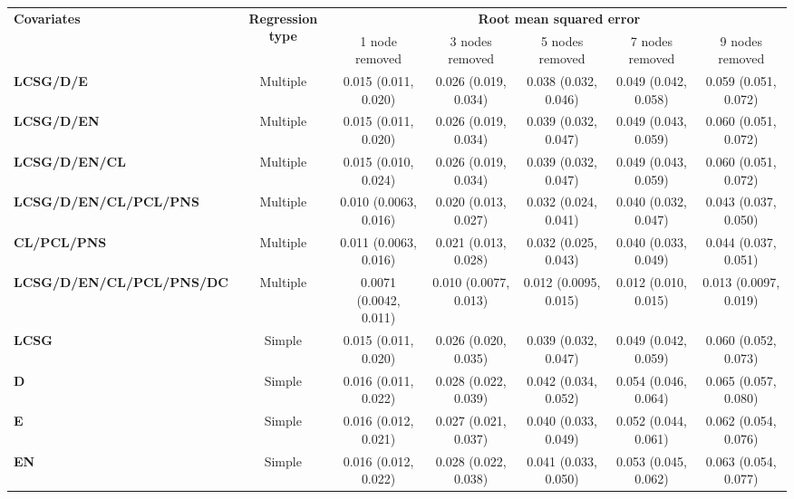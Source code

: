 \begin{landscape}

\vspace*{\fill}
\begin{table}[!hp]
\centering
\tiny
\renewcommand\tabcolsep{3pt}

\begin{tabular}{lcccccc}
\toprule

\multirow{2}{*}{\textbf{Covariates}} & \multirow{2}{*}{\textbf{Regression type}} & \multicolumn{5}{c}{\textbf{Root mean squared error}} \\
 & & 1 node removed & 3 nodes removed & 5 nodes removed & 7 nodes removed & 9 nodes removed \\
\midrule

\textbf{LCSG/D/E} & Multiple & 0.015 (0.011, 0.020) & 0.026 (0.019, 0.034) & 0.038 (0.032, 0.046) & 0.049 (0.042, 0.058) & 0.059 (0.051, 0.072) \\ 
\textbf{LCSG/D/EN} & Multiple & 0.015 (0.011, 0.020) & 0.026 (0.019, 0.034) & 0.039 (0.032, 0.047) & 0.049 (0.043, 0.059) & 0.060 (0.051, 0.072) \\ 
\textbf{LCSG/D/EN/CL} & Multiple & 0.015 (0.010, 0.024) & 0.026 (0.019, 0.034) & 0.039 (0.032, 0.047) & 0.049 (0.043, 0.059) & 0.060 (0.051, 0.072) \\ 
\textbf{LCSG/D/EN/CL/PCL/PNS} & Multiple & 0.010 (0.0063, 0.016) & 0.020 (0.013, 0.027) & 0.032 (0.024, 0.041) & 0.040 (0.032, 0.047) & 0.043 (0.037, 0.050) \\ 
\textbf{CL/PCL/PNS} & Multiple & 0.011 (0.0063, 0.016) & 0.021 (0.013, 0.028) & 0.032 (0.025, 0.043) & 0.040 (0.033, 0.049) & 0.044 (0.037, 0.051) \\ 
\textbf{LCSG/D/EN/CL/PCL/PNS/DC} & Multiple & 0.0071 (0.0042, 0.011) & 0.010 (0.0077, 0.013) & 0.012 (0.0095, 0.015) & 0.012 (0.010, 0.015) & 0.013 (0.0097, 0.019) \\ 
\textbf{LCSG} & Simple & 0.015 (0.011, 0.020) & 0.026 (0.020, 0.035) & 0.039 (0.032, 0.047) & 0.049 (0.042, 0.059) & 0.060 (0.052, 0.073) \\ 
\textbf{D} & Simple & 0.016 (0.011, 0.022) & 0.028 (0.022, 0.039) & 0.042 (0.034, 0.052) & 0.054 (0.046, 0.064) & 0.065 (0.057, 0.080) \\ 
\textbf{E} & Simple & 0.016 (0.012, 0.021) & 0.027 (0.021, 0.037) & 0.040 (0.033, 0.049) & 0.052 (0.044, 0.061) & 0.062 (0.054, 0.076) \\ 
\textbf{EN} & Simple & 0.016 (0.012, 0.022) & 0.028 (0.022, 0.038) & 0.041 (0.033, 0.050) & 0.053 (0.045, 0.062) & 0.063 (0.054, 0.077) \\ 

\end{tabular}
\end{table}
\end{landscape}
